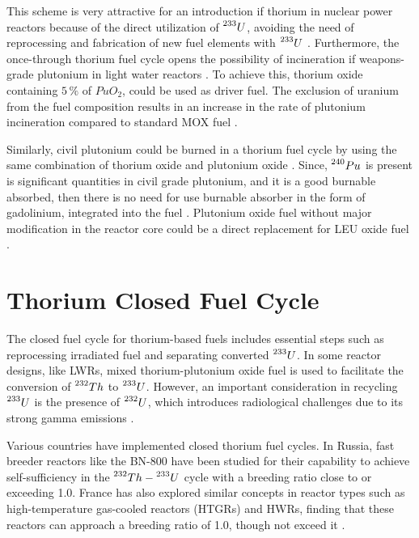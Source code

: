 This scheme is very attractive for an introduction if thorium in nuclear power reactors because of the direct utilization of \(\prescript{233}{}{U}\), avoiding the need of reprocessing and fabrication of new fuel elements with \(\prescript{233}{}{U}\) \cite{IAEA_Th_Potential}. Furthermore, the once-through thorium fuel cycle opens the possibility of incineration if weapons-grade plutonium in light water reactors \cite{IAEA_Th_Potential}. To achieve this, thorium oxide containing \(5 \, \%\) of \(PuO_2\), could be used as driver fuel. The exclusion of uranium from the fuel composition results in an increase in the rate of plutonium incineration compared to standard MOX fuel \cite{IAEA_Th_Potential}.

Similarly, civil plutonium could be burned in a thorium fuel cycle by using the same combination of thorium oxide and plutonium oxide \cite{IAEA_Th_Potential}. Since, \(\prescript{240}{}{Pu}\) is present is significant quantities in civil grade plutonium, and it is a good burnable absorbed, then there is no need for use burnable absorber in the form of gadolinium, integrated into the fuel \cite{IAEA_Th_Potential}. Plutonium oxide fuel without major modification in the reactor core could be a direct replacement for LEU oxide fuel \cite{IAEA_Th_Potential}.

\section{Thorium Closed Fuel Cycle}

The closed fuel cycle for thorium-based fuels includes essential steps such as reprocessing irradiated fuel and separating converted \(\prescript{233}{}{U}\). In some reactor designs, like LWRs, mixed thorium-plutonium oxide fuel is used to facilitate the conversion of \(\prescript{232}{}{Th}\) to \(\prescript{233}{}{U}\). However, an important consideration in recycling \(\prescript{233}{}{U}\) is the presence of \(\prescript{232}{}{U}\), which introduces radiological challenges due to its strong gamma emissions \cite{IAEA_Th_Potential}.

Various countries have implemented closed thorium fuel cycles. In Russia, fast breeder reactors like the BN-800 have been studied for their capability to achieve self-sufficiency in the \(\prescript{232}{}{Th}-\prescript{233}{}{U}\) cycle with a breeding ratio close to or exceeding 1.0. France has also explored similar concepts in reactor types such as high-temperature gas-cooled reactors (HTGRs) and HWRs, finding that these reactors can approach a breeding ratio of 1.0, though not exceed it \cite{IAEA_Th_Potential}.

